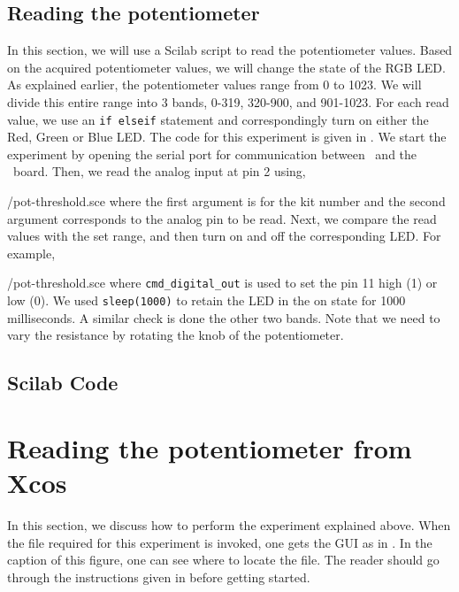 \subsection{Reading the potentiometer}
In this section, we will use a Scilab script to read the potentiometer
values.  Based on the acquired potentiometer values, we will change
the state of the RGB LED. As explained earlier, the potentiometer
values range from 0 to 1023. We will divide this entire range into 3
bands, 0-319, 320-900, and 901-1023. For each read value, we use an
{\tt if elseif} statement and correspondingly turn on either the Red,
Green or Blue LED. The code for this experiment is given in
. We start the experiment by opening the serial
port for communication between \scilab\ and the \arduino\ board. Then,
we read the analog input at pin 2 using,

                {\LocPotscicode/pot-threshold.sce} where the first
                argument is for
the kit number and the second argument corresponds to the analog pin to be read.  Next, we compare the read values with the set range, and then turn on and off the corresponding LED. For example, 

{\LocPotscicode/pot-threshold.sce} where {\tt cmd\_digital\_out} is used to set the pin 11 high (1) or low (0). We used {\tt sleep(1000)} to retain the LED in the on state for 1000 milliseconds.  A similar check is done the other two bands. Note that we need to vary the resistance by rotating the knob of the potentiometer.

\subsection{Scilab Code}
\label{sec:pot-scilab-code}
\begin{scicode}
\label{sci:pot-100}

\end{scicode}

\section{Reading the potentiometer from Xcos}
In this section, we discuss how to perform the experiment explained
above.  When the file required for this experiment is invoked, one
gets the GUI as in .  In the caption of this
figure, one can see where to locate the file.  The reader should go
through the instructions given in  before
getting started.

